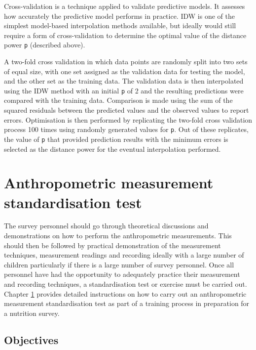 \documentclass[12pt,a4paper]{book}
\theoremstyle{definition}
\theoremstyle{definition}
\theoremstyle{definition}
\theoremstyle{remark}
\begin{document}
Cross-validation is a technique applied to validate predictive models.
It assesses how accurately the predictive model performs in practice.
IDW is one of the simplest model-based interpolation methods available,
but ideally would still require a form of cross-validation to determine
the optimal value of the distance power \texttt{p} (described above).

A two-fold cross validation \citep{bivand2008applied} in which data
points are randomly split into two sets of equal size, with one set
assigned as the validation data for testing the model, and the other set
as the training data. The validation data is then interpolated using the
IDW method with an initial \texttt{p} of 2 and the resulting predictions
were compared with the training data. Comparison is made using the sum
of the squared residuals between the predicted values and the observed
values to report errors. Optimisation is then performed by replicating
the two-fold cross validation process 100 times using randomly generated
values for \texttt{p}. Out of these replicates, the value of \texttt{p}
that provided prediction results with the minimum errors is selected as
the distance power for the eventual interpolation performed.

\hypertarget{standard}{%
\chapter{Anthropometric measurement standardisation
test}\label{standard}}

The survey personnel should go through theoretical discussions and
demonstrations on how to perform the anthropometric measurements. This
should then be followed by practical demonstration of the measurement
techniques, measurement readings and recording ideally with a large
number of children particularly if there is a large number of survey
personnel. Once all personnel have had the opportunity to adequately
practice their measurement and recording techniques, a standardisation
test or exercise must be carried out. Chapter \ref{standard} provides
detailed instructions on how to carry out an anthropometric measurement
standardisation test as part of a training process in preparation for a
nutrition survey.

\hypertarget{objectives}{%
\section{Objectives}\label{objectives}}
\end{document}
